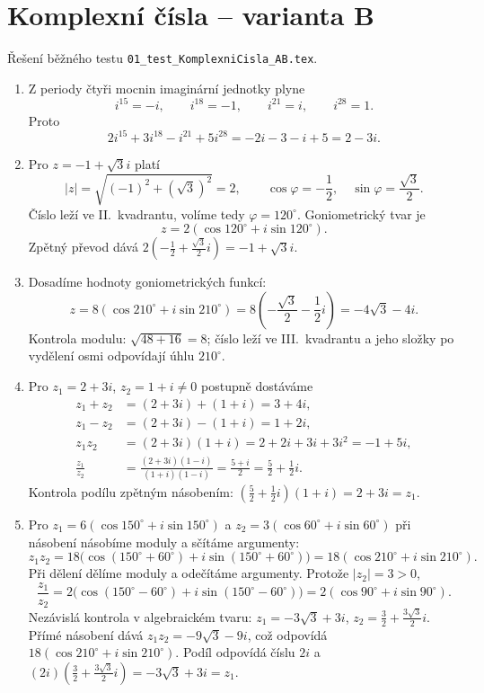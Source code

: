 \documentclass[a4paper,10pt]{article}
\begin{document}
\newpage
\section*{Komplexní čísla -- varianta B}
Řešení běžného testu \texttt{01\_test\_KomplexniCisla\_AB.tex}.
\begin{enumerate}
\item Z periody čtyři mocnin imaginární jednotky plyne
\[
i^{15}=-i,\qquad i^{18}=-1,\qquad i^{21}=i,\qquad i^{28}=1.
\]
Proto
\[
2i^{15}+3i^{18}-i^{21}+5i^{28}
=-2i-3-i+5=2-3i.
\]

\item Pro $z=-1+\sqrt3i$ platí
\[
|z|=\sqrt{(-1)^2+(\sqrt3)^2}=2,\qquad
\cos\varphi=-\frac12,\quad \sin\varphi=\frac{\sqrt3}{2}.
\]
Číslo leží ve II.~kvadrantu, volíme tedy $\varphi=120^\circ$.
Goniometrický tvar je
\[
z=2(\cos120^\circ+i\sin120^\circ).
\]
Zpětný převod dává $2(-\frac12+\frac{\sqrt3}{2}i)=-1+\sqrt3i$.

\item Dosadíme hodnoty goniometrických funkcí:
\[
z=8(\cos210^\circ+i\sin210^\circ)
=8\left(-\frac{\sqrt3}{2}-\frac12i\right)=-4\sqrt3-4i.
\]
Kontrola modulu: $\sqrt{48+16}=8$; číslo leží ve III.~kvadrantu
a jeho složky po vydělení osmi odpovídají úhlu $210^\circ$.

\item Pro $z_1=2+3i$, $z_2=1+i\neq0$ postupně dostáváme
\begin{align*}
z_1+z_2&=(2+3i)+(1+i)=3+4i,\\
z_1-z_2&=(2+3i)-(1+i)=1+2i,\\
z_1z_2&=(2+3i)(1+i)=2+2i+3i+3i^2=-1+5i,\\
\frac{z_1}{z_2}
&=\frac{(2+3i)(1-i)}{(1+i)(1-i)}
=\frac{5+i}{2}=\frac52+\frac12i.
\end{align*}
Kontrola podílu zpětným násobením:
$(\frac52+\frac12i)(1+i)=2+3i=z_1$.

\item Pro $z_1=6(\cos150^\circ+i\sin150^\circ)$ a
$z_2=3(\cos60^\circ+i\sin60^\circ)$
při násobení násobíme moduly a sčítáme argumenty:
\[
z_1z_2=18\bigl(\cos(150^\circ+60^\circ)+i\sin(150^\circ+60^\circ)\bigr)
=18(\cos210^\circ+i\sin210^\circ).
\]
Při dělení dělíme moduly a odečítáme argumenty. Protože $|z_2|=3>0$,
\[
\frac{z_1}{z_2}
=2\bigl(\cos(150^\circ-60^\circ)+i\sin(150^\circ-60^\circ)\bigr)
=2(\cos90^\circ+i\sin90^\circ).
\]
Nezávislá kontrola v algebraickém tvaru:
$z_1=-3\sqrt3+3i$, $z_2=\frac32+\frac{3\sqrt3}{2}i$.
Přímé násobení dává $z_1z_2=-9\sqrt3-9i$, což odpovídá
$18(\cos210^\circ+i\sin210^\circ)$.
Podíl odpovídá číslu $2i$ a
$(2i)(\frac32+\frac{3\sqrt3}{2}i)=-3\sqrt3+3i=z_1$.
\end{enumerate}
\end{document}
